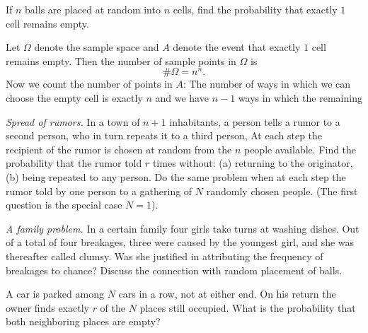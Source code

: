\begin{problem}
  If \(n\) balls are placed at random into \(n\) cells, find the
  probability that exactly \(1\) cell remains empty.
\end{problem}
\begin{solution}
  Let \(\Omega\) denote the sample space and \(A\) denote the event that
  exactly \(1\) cell remains empty. Then the number of sample points in
  \(\Omega\) is
  \[
    \#\Omega=n^n.
  \]
  Now we count the number of points in \(A\): The number of ways in which
  we can choose the empty cell is exactly \(n\) and we have \(n-1\) ways in
  which the remaining
\end{solution}
\newpage

\begin{problem}
  \emph{Spread of rumors.} In a town of \(n+1\) inhabitants, a person tells
  a rumor to a second person, who in turn repeats it to a third person,
  \etc{} At each step the recipient of the rumor is chosen at random from the
  \(n\) people available. Find the probability that the rumor told \(r\)
  times without: (a) returning to the originator, (b) being repeated to any
  person. Do the same problem when at each step the rumor told by one
  person to a gathering of \(N\) randomly chosen people. (The first
  question is the special case \(N=1\)).
\end{problem}
\begin{solution}

\end{solution}
\newpage

\begin{problem}
  \emph{A family problem.} In a certain family four girls take turns at
  washing dishes. Out of a total of four breakages, three were caused by
  the youngest girl, and she was thereafter called clumsy. Was she
  justified in attributing the frequency of breakages to chance? Discuss
  the connection with random placement of balls.
\end{problem}
\begin{solution}

\end{solution}
\newpage

\begin{problem}
  A car is parked among \(N\) cars in a row, not at either end. On his
  return the owner finds exactly \(r\) of the \(N\) places still
  occupied. What is the probability that both neighboring places are empty?
\end{problem}
\begin{solution}

\end{solution}
\newpage

